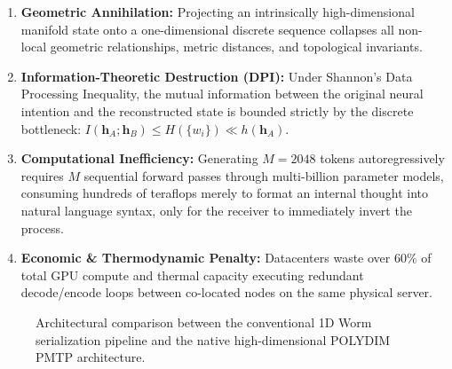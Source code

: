 \documentclass[11pt,twoside,a4paper]{article}
\theoremstyle{plain}
\theoremstyle{definition}
\theoremstyle{remark}
\newcommand{\R}{\mathbb{R}}
\begin{document}
\begin{enumerate}
    \item \textbf{Geometric Annihilation:} Projecting an intrinsically high-dimensional manifold state onto a one-dimensional discrete sequence collapses all non-local geometric relationships, metric distances, and topological invariants.
    \item \textbf{Information-Theoretic Destruction (DPI):} Under Shannon's Data Processing Inequality, the mutual information between the original neural intention and the reconstructed state is bounded strictly by the discrete bottleneck: $I(\mathbf{h}_A; \mathbf{h}_B) \le H(\{w_i\}) \ll h(\mathbf{h}_A)$.
    \item \textbf{Computational Inefficiency:} Generating $M = 2048$ tokens autoregressively requires $M$ sequential forward passes through multi-billion parameter models, consuming hundreds of teraflops merely to format an internal thought into natural language syntax, only for the receiver to immediately invert the process.
    \item \textbf{Economic & Thermodynamic Penalty:} Datacenters waste over $60\%$ of total GPU compute and thermal capacity executing redundant decode/encode loops between co-located nodes on the same physical server.
\end{enumerate}

\begin{figure}[h]
\centering
{}
\caption{Architectural comparison between the conventional 1D Worm serialization pipeline and the native high-dimensional POLYDIM PMTP architecture.}
\label{fig:worm_vs_polydim}
\end{figure}
\end{document}
